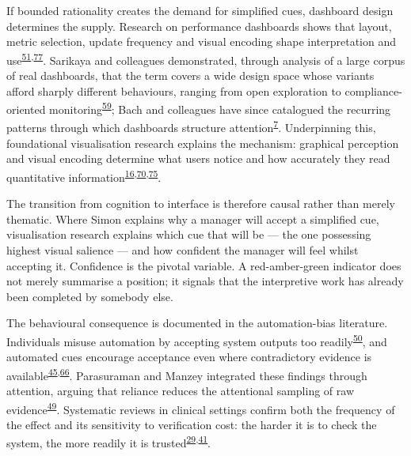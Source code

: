 \documentclass[11pt,a4paper]{article}
\numberwithin{figure}{section}
\numberwithin{table}{section}
\begin{document}
If bounded rationality creates the demand for simplified cues, dashboard design determines the supply.
Research on performance dashboards shows that layout, metric selection, update frequency and visual
encoding shape interpretation and use\textsuperscript{\hyperlink{ref51}{51},\hyperlink{ref77}{77}}. Sarikaya and colleagues demonstrated,
through analysis of a large corpus of real dashboards, that the term covers a wide design space whose
variants afford sharply different behaviours, ranging from open exploration to compliance-oriented
monitoring\textsuperscript{\hyperlink{ref59}{59}}; Bach and colleagues have since catalogued the recurring patterns through which
dashboards structure attention\textsuperscript{\hyperlink{ref7}{7}}. Underpinning this, foundational visualisation research explains
the mechanism: graphical perception and visual encoding determine what users notice and how accurately they
read quantitative information\textsuperscript{\hyperlink{ref16}{16},\hyperlink{ref70}{70},\hyperlink{ref75}{75}}.

The transition from cognition to interface is therefore causal rather than merely thematic. Where Simon
explains why a manager will accept a simplified cue, visualisation research explains which cue that will be
--- the one possessing highest visual salience --- and how confident the manager will feel whilst accepting
it. Confidence is the pivotal variable. A red-amber-green indicator does not merely summarise a position;
it signals that the interpretive work has already been completed by somebody else.

The behavioural consequence is documented in the automation-bias literature. Individuals misuse automation
by accepting system outputs too readily\textsuperscript{\hyperlink{ref50}{50}}, and automated cues encourage acceptance even
where contradictory evidence is available\textsuperscript{\hyperlink{ref45}{45},\hyperlink{ref66}{66}}. Parasuraman and Manzey integrated
these findings through attention, arguing that reliance reduces the attentional sampling of raw
evidence\textsuperscript{\hyperlink{ref49}{49}}. Systematic reviews in clinical settings confirm both the frequency of the
effect and its sensitivity to verification cost: the harder it is to check the system, the more readily it
is trusted\textsuperscript{\hyperlink{ref29}{29},\hyperlink{ref41}{41}}.
\end{document}
